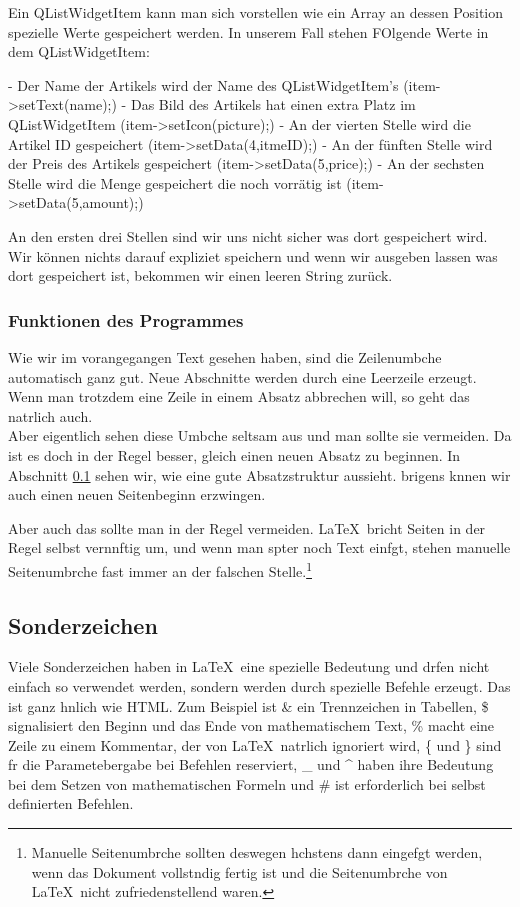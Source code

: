 \documentclass[11pt,a4paper]{article} %
\begin{document}
Ein QListWidgetItem kann man sich vorstellen wie ein Array an dessen Position spezielle Werte gespeichert werden.
In unserem Fall stehen FOlgende Werte in dem QListWidgetItem:
\par
- Der Name der Artikels wird der Name des QListWidgetItem's (item->setText(name);)
- Das Bild des Artikels hat einen extra Platz im QListWidgetItem (item->setIcon(picture);)
- An der vierten Stelle wird die Artikel ID gespeichert (item->setData(4,itmeID);)
- An der fünften Stelle wird der Preis des Artikels gespeichert (item->setData(5,price);)
- An der sechsten Stelle wird die Menge gespeichert die noch vorrätig ist (item->setData(5,amount);)
\par
An den ersten drei Stellen sind wir uns nicht sicher was dort gespeichert wird.
Wir können nichts darauf expliziet speichern und wenn wir ausgeben lassen was dort gespeichert ist, bekommen wir einen leeren String zurück.
\subsubsection{Funktionen des Programmes}


Wie wir im vorangegangen Text gesehen haben, sind die Zeilenumbche automatisch ganz gut. Neue Abschnitte werden durch eine Leerzeile erzeugt. Wenn man trotzdem eine Zeile in einem Absatz abbrechen will, so geht das natrlich auch. \\  Aber eigentlich sehen diese Umbche seltsam aus und man sollte sie vermeiden. Da ist es doch in der Regel besser, gleich einen neuen Absatz zu beginnen. In Abschnitt \ref{Sonderzeichen} sehen wir, wie eine gute Absatzstruktur aussieht. brigens knnen wir auch einen neuen Seitenbeginn erzwingen.

\newpage

Aber auch das sollte man in der Regel vermeiden. \LaTeX\ bricht Seiten in der Regel selbst vernnftig um, und wenn man spter noch Text einfgt, stehen manuelle Seitenumbrche fast immer an der falschen Stelle.\footnote{Manuelle Seitenumbrche sollten deswegen hchstens dann eingefgt werden, wenn das Dokument vollstndig fertig ist und die Seitenumbrche von \LaTeX\ nicht zufriedenstellend waren.}

\subsection{Sonderzeichen}
\label{Sonderzeichen}

Viele Sonderzeichen haben in \LaTeX\ eine spezielle Bedeutung und drfen nicht einfach so verwendet werden, sondern werden durch spezielle Befehle erzeugt. Das ist ganz hnlich wie HTML. Zum Beispiel ist \& ein Trennzeichen in Tabellen, \$ signalisiert den Beginn und das Ende von mathematischem Text, \% macht eine Zeile zu einem Kommentar, der von \LaTeX\ natrlich ignoriert wird, \{ und \} sind fr die Parametebergabe bei Befehlen reserviert, \_ und \^{} haben ihre Bedeutung bei dem Setzen von mathematischen Formeln und \# ist erforderlich bei selbst definierten Befehlen.
\end{document}
